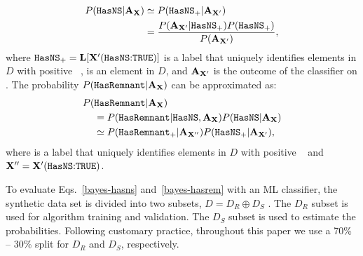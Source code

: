 \begin{align}
\label{bayes-hasns}
P({{\tt HasNS}}|{\bf A}_{\bf X})&\simeq P({{\tt HasNS}}_+|{\bf A}_{{\bf X}'}) \nonumber \\
&=\frac{P({\bf A}_{{\bf X}'}|{{\tt HasNS}}_+)P({{\tt HasNS}}_+)}{P({\bf A}_{{\bf X}'})},
\end{align}
%
where ${{\tt HasNS}}_+={\bf L}[{\bf X}'(\hbox{{{\tt HasNS}}:{{\tt TRUE}}})]$ is a label that uniquely identifies elements in $D$  with positive \tocheck{(+)} \hasns\ ,  is an element in $D$, and ${\bf A}_{{\bf X}'}$ is the outcome of the classifier on .  The probability $P({{\tt HasRemnant}}|{\bf A}_{\bf X})$ can be approximated as:
%
\begin{align}
\label{bayes-hasrem}
P(&{{\tt HasRemnant}}|{\bf A}_{\bf X}) \nonumber  \\
&=P({{\tt HasRemnant}}|{{\tt HasNS}}, {\bf A}_{\bf X})P({{\tt HasNS}}|{\bf A}_{\bf X}) \nonumber \\
&\simeq P({{\tt HasRemnant}}_+|{\bf A}_{{\bf X}''})P({{\tt HasNS}}_+|{\bf A}_{{\bf X}'}),
\end{align}
where  is a label that uniquely identifies elements in $D$  with positive \tocheck{(+)} \hasrem\  and ${\bf X}''= {\bf X}'(\hbox{{{\tt HasNS}}:{{\tt TRUE}}})$.

To evaluate Eqs.~\eqref{bayes-hasns} and~\eqref{bayes-hasrem} with an \ac{ML} classifier, the synthetic data set is divided into two subsets, $D=D_R\oplus D_S$ . The $D_R$ subset is used
for algorithm training and validation. The $D_S$ subset is used to estimate the probabilities. Following customary practice, throughout this paper we use a 70\% -- 30\% split for $D_R$
and $D_S$, respectively.

